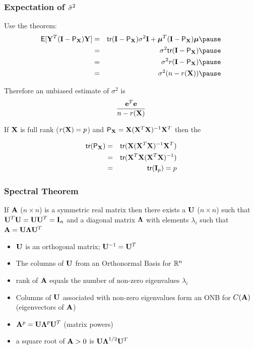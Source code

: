 \documentclass{beamer}
\begin{document}
\begin{frame}
  \frametitle{Expectation of ${\hat{\sigma}}^2$}
  
Use the theorem: \pause
\begin{eqnarray*}
\E[\Y^T (\I - \P_\X) \Y] & = &\tr (\I - \P_\X) \sigma^2 \I +
\mub^T(\I - \P_\X) \mub  \pause \\
 & = &  \sigma^2 \tr (\I - \P_\X) \pause \\
 & = & \sigma^2 r(\I - \P_\X) \pause\\
& = & \sigma^2 (n - r(\X)) \pause
\end{eqnarray*}


Therefore an unbiased estimate of $\sigma^2$ is $$\frac{\mathbf{e}^T\mathbf{e}}{n - r(\mathbf{X})}$$
\pause

If $\mathbf{X}$ is full rank ($r(\mathbf{X}) = p$) and $\textsf{P}_{\mathbf{X}} = \mathbf{X}(\mathbf{X}^T\mathbf{X})^{-1} \mathbf{X}^T$ then the 

\begin{eqnarray*}
\textsf{tr}(\textsf{P}_{\mathbf{X}}) & = & \textsf{tr}( \mathbf{X}(\mathbf{X}^T\mathbf{X})^{-1} \mathbf{X}^T) \\
&  = &  \textsf{tr}(\mathbf{X}^T\mathbf{X}(\mathbf{X}^T\mathbf{X})^{-1}) \\
&  = & \textsf{tr}(\mathbf{I}_p) = p
\end{eqnarray*}


\end{frame}
\begin{frame}
  \frametitle{Spectral Theorem}
  \begin{theorem}
    If $\mathbf{A}$ ($n \times n$) is a symmetric real matrix  then there
    exists a  $\mathbf{U}$ ($n \times n$) such that $\mathbf{U}^T\mathbf{U} = \mathbf{U} \mathbf{U}^T = \mathbf{I}_n$
     and a diagonal matrix $\boldsymbol{\Lambda}$ with
    elements $\lambda_i$ such that $\mathbf{A} = \mathbf{U} \boldsymbol{\Lambda} \mathbf{U}^T$
  \end{theorem} \pause
  \begin{itemize}
  \item $\mathbf{U}$ is an orthogonal matrix; $\mathbf{U}^{-1} = \mathbf{U}^T$ \pause
  \item The columns of $\mathbf{U}$ from an Orthonormal Basis for $\mathbb{R}^n$ \pause
  \item rank of $\mathbf{A}$ equals the number of non-zero eigenvalues
    $\lambda_i$ \pause
  \item Columns of $\mathbf{U}$ associated with non-zero eigenvalues form an
    ONB for $C(\mathbf{A})$ (eigenvectors of $\mathbf{A}$) \pause
\item $\mathbf{A}^p = \mathbf{U} \boldsymbol{\Lambda}^p \mathbf{U}^T$ (matrix powers) \pause
\item a square root of $\mathbf{A} > 0$ is $\mathbf{U} \boldsymbol{\Lambda}^{1/2}\mathbf{U}^T$ \pause
  \end{itemize}
\end{frame}
\end{document}
